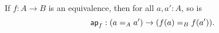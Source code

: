 \documentclass[hott-all.tex]{subfiles}
\begin{document}
%
\begin{thm}\label{thm:paths-respects-equiv}
  If $f : A \to B$ is an equivalence, then for all $a,a':A$, so is
  \[\apfunc{f} : (\id[A]{a}{a'}) \to (\id[B]{f(a)}{f(a')}).\]
\end{thm}
\end{document}
